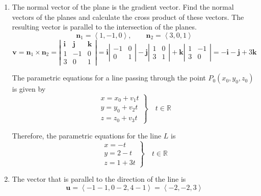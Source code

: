 \documentclass[a4paper, 12pt]{article}
\begin{document}
\newpage
{}
{}



\begin{enumerate}[leftmargin=*,label=\textbf{\arabic*.}]
\item The normal vector of the plane is the gradient vector. Find the normal vectors of the planes and calculate the cross product of these vectors. The resulting vector is parallel to the intersection of the planes.
\[\mathbf{n}_1=\left\langle1,-1,0\right\rangle,\qquad \mathbf{n}_2=\left\langle3,0,1\right\rangle\]
\[\mathbf{v}=\mathbf{n}_1\times\mathbf{n}_2=\left|\begin{array}{ccc}
\mathbf{i}&\mathbf{j}&\mathbf{k}\\
1&-1&0\\
3&0&1
\end{array}\right|=\mathbf{i}\left|\begin{array}{cc}
-1&0\\0&1
\end{array}\right|-\mathbf{j}\left|\begin{array}{cc}
1&0\\3&1
\end{array}\right|+\mathbf{k}\left|\begin{array}{cc}
1&-1\\3&0
\end{array}\right|=-\mathbf{i}-\mathbf{j}+3\mathbf{k}\]

The parametric equations for a line passing through the point $P_0(x_0,y_0,z_0)$ is given by
\[\left.\begin{array}{c}
x=x_0+v_1t\\
y=y_0+v_2t\\
z=z_0+v_3t
\end{array}\right\}\quad t\in\mathbb{R}\]

Therefore, the parametric equations for the line $L$ is
\[\boxed{\left.\begin{array}{l}
x=-t\\
y=2-t\\
z=1+3t
\end{array}\right\}\quad t\in\mathbb{R}}\]

\item The vector that is parallel to the direction of the line is
\[\mathbf u=\left\langle-1-1,0-2,4-1\right\rangle=\left\langle-2,-2,3\right\rangle\]


\end{enumerate}
\end{document}
